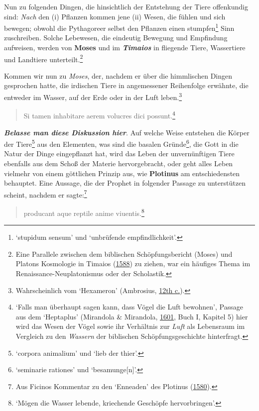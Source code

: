 \documentclass[
]{article}
\begin{document}
Nun zu folgenden Dingen, die hinsichtlich der Entstehung der Tiere
offenkundig sind: \emph{Nach} den (i) Pflanzen kommen jene (ii) Wesen,
die fühlen und sich bewegen; obwohl die Pythagoreer selbst den Pflanzen 
einen stumpfen\footnote{`stupidum sensum' und `unbrüfende
  empfindlichkeit'.} Sinn zuschreiben. Solche Lebewesen, die eindeutig
Bewegung und Empfindung aufweisen, werden von \textbf{Moses} und im
\textbf{\emph{Timaios}} in fliegende Tiere, Wassertiere und Landtiere
unterteilt.\footnote{Eine Parallele zwischen dem biblischen
  Schöpfungsbericht (Moses) und Platons Kosmologie in Timaios
  (\href{https://doi.org/10.3931/e-rara-24349}{1588}) zu ziehen, war ein
  häufiges Thema im Renaissance-Neuplatonismus oder der Scholastik.}

Kommen wir nun zu \emph{Moses}, der, nachdem er über die himmlischen
Dingen gesprochen hatte, die irdischen Tiere in angemessener Reihenfolge
erwähnte, die entweder im Wasser, auf der Erde oder in der Luft
leben.\footnote{Wahrscheinlich vom `Hexameron' (Ambrosius,
  \href{https://mdz-nbn-resolving.de/details:bsb00046506}{12th c.}).}

\begin{quote}
Si tamen inhabitare aerem volucres dici possunt.\footnote{`Falls man
  überhaupt sagen kann, dass Vögel die Luft bewohnen', Passage aus dem
  `Heptaplus' (Mirandola \& Mirandola,
  \href{https://doi.org/10.3931/e-rara-61217}{1601}, Buch I, Kapitel 5)
  hier wird das Wesen der Vögel sowie ihr Verhältnis zur \emph{Luft} als
  Lebensraum im Vergleich zu den \emph{Wassern} der biblischen
  Schöpfungsgeschichte hinterfragt.}
\end{quote}

\textbf{\emph{Belasse man diese Diskussion hier}}. Auf welche Weise
entstehen die Körper der Tiere\footnote{`corpora animalium' und `lieb
  der thier'.} aus den Elementen, was sind die basalen
Gründe\footnote{`seminarie rationes' und `besamunge{[}n{]}'.}, die Gott
in die Natur der Dinge eingepflanzt hat, wird das Leben der
unvernünftigen Tiere ebenfalls aus dem Schoß der Materie hervorgebracht,
oder geht alles Leben vielmehr von einem göttlichen Prinzip aus, wie
\textbf{Plotinus} am entschiedensten behauptet. Eine Aussage, die der
Prophet in folgender Passage zu unterstützen scheint, nachdem er
sagte:\footnote{Aus Ficinos Kommentar zu den `Enneaden' des Plotinus
  (\href{https://doi.org/10.3931/e-rara-120889}{1580}).}

\begin{quote}
producant aque reptile anime viuentis.\footnote{`Mögen die Wasser
  lebende, kriechende Geschöpfe hervorbringen'.}
\end{quote}
\end{document}
